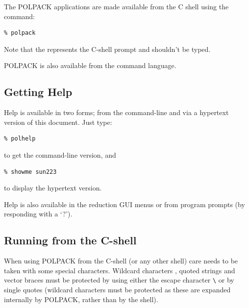 The POLPACK applications are made available from the C shell using the command:
\begin{myquote}
\begin{verbatim}
% polpack
\end{verbatim}
\end{myquote}

Note that the \text{\%} represents the C-shell prompt and shouldn't be typed.

POLPACK is also available from the  command language.

\subsection{Getting Help}

Help is available in two forms; from the command-line and via a
hypertext version of this document. Just type:

\begin{myquote}
\begin{verbatim}
% polhelp
\end{verbatim}
\end{myquote}

to get the command-line version, and

\begin{myquote}
\begin{verbatim}
% showme sun223
\end{verbatim}
\end{myquote}

to display the hypertext version. 

Help is also available in the reduction GUI menus or from program
prompts (by responding with a `?').

\subsection{Running from the C-shell}
When using POLPACK from the C-shell (or any other shell) care needs to be
taken with some special characters. Wildcard characters ,
quoted strings  and vector braces \text{[ ]} must be protected
by using either the escape character {\small \verb+\+} or by single
quotes (wildcard characters must be protected as these are expanded
internally by POLPACK, rather than by the shell).

